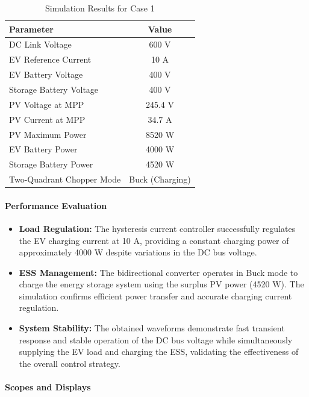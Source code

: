 \begin{itemize}
\begin{table}[H]
\centering
\caption{Simulation Results for Case 1}
\label{tab:case1}
\begin{tabular}{|l|c|}
\hline
\textbf{Parameter} & \textbf{Value} \\
\hline
DC Link Voltage & 600 V \\
EV Reference Current & 10 A \\
EV Battery Voltage & 400 V \\
Storage Battery Voltage & 400 V \\
PV Voltage at MPP & 245.4 V \\
PV Current at MPP & 34.7 A \\
PV Maximum Power & 8520 W \\
EV Battery Power & 4000 W \\
Storage Battery Power & 4520 W \\
Two-Quadrant Chopper Mode & Buck (Charging) \\
\hline
\end{tabular}
\end{table}

\paragraph{Performance Evaluation}

\begin{itemize}

\item \textbf{Load Regulation:}
The hysteresis current controller successfully regulates the EV charging current at 10 A, providing a constant charging power of approximately 4000 W despite variations in the DC bus voltage.

\item \textbf{ESS Management:}
The bidirectional converter operates in Buck mode to charge the energy storage system using the surplus PV power (4520 W). The simulation confirms efficient power transfer and accurate charging current regulation.

\item \textbf{System Stability:}
The obtained waveforms demonstrate fast transient response and stable operation of the DC bus voltage while simultaneously supplying the EV load and charging the ESS, validating the effectiveness of the overall control strategy.

\end{itemize}

\paragraph{Scopes and Displays}



\end{itemize}
